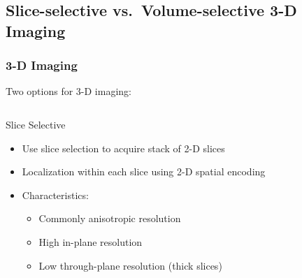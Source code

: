 


\subsection{Slice-selective vs.~Volume-selective 3-D Imaging} %
\label{sub:slice_selective_vs_volume_selective_3_d_imaging}

\begin{frame}
	\frametitle{3-D Imaging}
	
	Two options for 3-D imaging:
	
	\vspace{-2ex}
	
	\begin{columns}[t,onlytextwidth]

	    \begin{block}{Slice Selective}
	        \begin{itemize}
	            \small
	            \item Use slice selection to acquire stack of 2-D slices
				\item Localization within each slice using 2-D spatial encoding
				\item Characteristics:
				\begin{itemize}
					\item Commonly anisotropic resolution
					\item High in-plane resolution
					\item Low through-plane resolution (thick slices)
				\end{itemize}
	        \end{itemize}
	    \end{block}


	\end{columns}
\end{frame}

